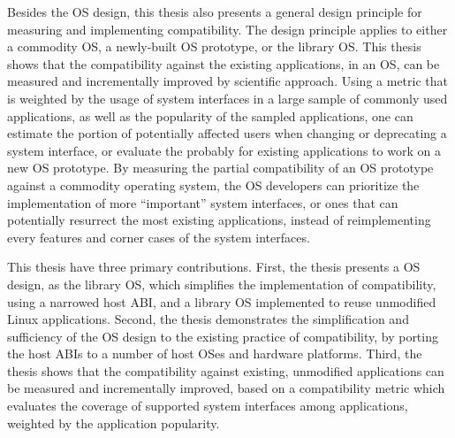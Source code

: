 Besides the OS design, this thesis also presents a general design principle
for measuring and implementing compatibility. The design principle applies to either a commodity OS, a newly-built OS prototype, or the \graphene{} library OS.
This thesis shows that the compatibility against the existing applications, in an OS, can be measured and incrementally improved by scientific approach.
Using a metric that is weighted by the usage of system interfaces in a large sample of commonly used applications, as well as the popularity of the sampled applications, one can estimate the portion of potentially affected users when changing or deprecating a system interface, or evaluate the probably for existing applications to work on a new OS prototype. By measuring the partial compatibility of an OS prototype against a commodity operating system, the OS developers can prioritize the implementation of more ``important'' system interfaces, or ones that can potentially resurrect the most existing applications, instead of reimplementing every features and corner cases of the system interfaces.








This thesis have three primary contributions. First, the thesis presents a OS design, as the \graphene{} library OS, which simplifies the implementation of compatibility, using a narrowed host ABI, and a library OS implemented to reuse unmodified Linux applications.
Second, the thesis demonstrates the simplification and sufficiency of the OS design to the existing practice of compatibility, by porting the host ABIs to a number of host OSes and hardware platforms. Third, the thesis shows that the compatibility against existing, unmodified applications can be measured and incrementally improved, based on a compatibility metric which evaluates the coverage of supported system interfaces among applications, weighted by the application popularity.


